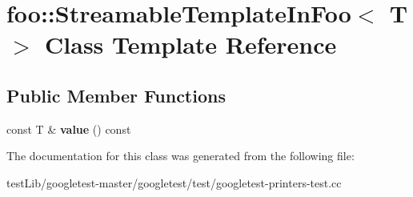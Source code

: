 \hypertarget{classfoo_1_1StreamableTemplateInFoo}{}\section{foo\+:\+:Streamable\+Template\+In\+Foo$<$ T $>$ Class Template Reference}
\label{classfoo_1_1StreamableTemplateInFoo}
\subsection*{Public Member Functions}
\begin{DoxyCompactItemize}
\item 
\mbox{\label{classfoo_1_1StreamableTemplateInFoo_aa6e29a9a298014ce74c65423b6985023}} 
const T \& {\bfseries value} () const
\end{DoxyCompactItemize}


The documentation for this class was generated from the following file\+:\begin{DoxyCompactItemize}
\item 
test\+Lib/googletest-\/master/googletest/test/googletest-\/printers-\/test.\+cc\end{DoxyCompactItemize}

